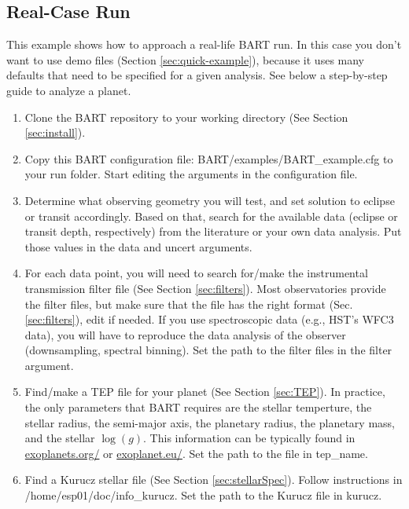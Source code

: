 \documentclass[letterpaper, 12pt]{article}
\begin{document}
\subsection{Real-Case Run}

This example shows how to approach a real-life BART run.  In this case you don't want to use demo files (Section \ref{sec:quick-example}), because it uses many defaults that need to be specified for a given analysis.  See below a step-by-step guide to analyze a planet.

\begin{enumerate}

\item  Clone the BART repository to your working directory (See Section \ref{sec:install}).

\item Copy this BART configuration file: BART/examples/BART\_example.cfg  to your run folder.  Start editing the arguments in the configuration file.

\item Determine what observing geometry you will test, and set {\tttb solution} to eclipse or transit accordingly.  Based on that, search for the available data (eclipse or transit depth, respectively) from the literature or your own data analysis.  Put those values in the {\tttb data} and {\tttb uncert} arguments.

\item For each data point, you will need to search for/make the instrumental transmission filter file (See Section \ref{sec:filters}).  Most observatories provide the filter files, but make sure that the file has the right format (Sec. \ref{sec:filters}), edit if needed.  If you use spectroscopic data (e.g., HST's WFC3 data), you will have to reproduce the data analysis of the observer (downsampling, spectral binning).  Set the path to the filter files in the {\tttb filter} argument.

\item Find/make a TEP file for your planet (See Section \ref{sec:TEP}).  In practice, the only parameters that BART requires are the stellar temperture, the stellar radius, the semi-major axis, the planetary radius, the planetary mass, and the stellar $\log(g)$.  This information can be typically found in \href{http://exoplanets.org/}{exoplanets.org/} or \href{http://exoplanet.eu/}{exoplanet.eu/}.  Set the path to the file in {\tttb tep\_name}.

\item Find a Kurucz stellar file (See Section \ref{sec:stellarSpec}).
Follow instructions in /home/esp01/doc/info\_kurucz.
Set the path to the Kurucz file in {\tttb kurucz}.


\end{enumerate}
\end{document}
